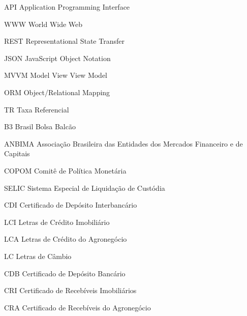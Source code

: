 \begin{siglas}
  \item[API] Application Programming Interface
  \item[WWW] World Wide Web
  \item[REST] Representational State Transfer
  \item[JSON] JavaScript Object Notation
  \item[MVVM] Model View View Model
  \item[ORM] Object/Relational Mapping
  
  \item[TR]  Taxa Referencial
  \item[B3]  Brasil Bolsa Balcão
  \item[ANBIMA] Associação Brasileira das Entidades dos Mercados Financeiro e de Capitais
  \item[COPOM] Comitê de Política Monetária
  \item[SELIC] Sistema Especial de Liquidação de Custódia
  \item[CDI] Certificado de Depósito Interbancário
  \item[LCI] Letras de Crédito Imobiliário
  \item[LCA] Letras de Crédito do Agronegócio
  \item[LC] Letras de Câmbio
  \item[CDB] Certificado de Depósito Bancário
  \item[CRI] Certificado de Recebíveis Imobiliários
  \item[CRA] Certificado de Recebíveis do Agronegócio
\end{siglas}